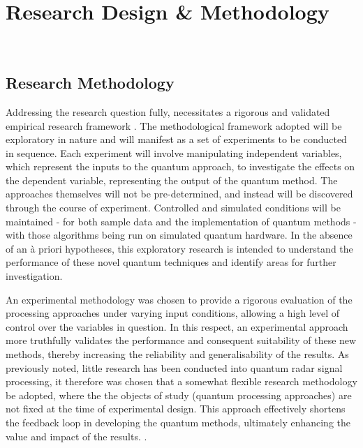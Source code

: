 \section{Research Design \& Methodology}~\label{sec:design}
\subsection{Research Methodology}


Addressing the research question fully, necessitates a rigorous and validated empirical research framework \cite{basili_experimentation_1986}.
The methodological framework adopted will be exploratory in nature and will manifest as a set of experiments to be conducted in sequence.
Each experiment will involve manipulating independent variables, which represent the inputs to the quantum approach, to investigate the effects on the dependent variable, representing the output of the quantum method.
The approaches themselves will not be pre-determined, and instead will be discovered through the course of experiment.
Controlled and simulated conditions will be maintained - for both sample data and the implementation of quantum methods - with those algorithms being run on simulated quantum hardware.
In the absence of an \`{a} priori hypotheses, this exploratory research is intended to understand the performance of these novel quantum techniques and identify areas for further investigation.

An experimental methodology was chosen to provide a rigorous evaluation of the processing approaches under varying input conditions, allowing a high level of control over the variables in question.
In this respect, an experimental approach more truthfully validates the performance and consequent suitability of these new methods, thereby increasing the reliability and generalisability of the results.
As previously noted, little research has been conducted into quantum radar signal processing, it therefore was chosen that a somewhat flexible research methodology \cite{anastas_research_1999} be adopted, where the the objects of study (quantum processing approaches) are not fixed at the time of experimental design.
This approach effectively shortens the feedback loop in developing the quantum methods, ultimately enhancing the value and impact of the results. \cite{karahasanovic_collecting_2005}.


